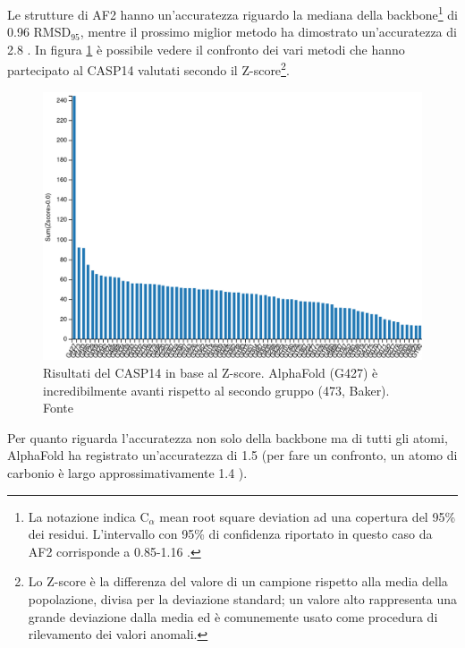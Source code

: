 \par Le strutture di AF2 hanno un'accuratezza riguardo la mediana della backbone\footnote{La notazione indica C$_{\alpha}$ mean root square deviation ad una copertura del 95\% dei residui. L'intervallo con 95\% di confidenza riportato in questo caso da AF2 corrisponde a 0.85-1.16 \angstrom.} di 0.96 RMSD$_{95}$, mentre il prossimo miglior metodo ha dimostrato un'accuratezza di 2.8 \angstrom. In figura \ref{fig:z-score} è possibile vedere il confronto dei vari metodi che hanno partecipato al CASP14 valutati secondo il Z-score\footnote{Lo Z-score è la differenza del valore di un campione rispetto alla media della popolazione, divisa per la deviazione standard; un valore alto rappresenta una grande deviazione dalla media ed è comunemente usato come procedura di rilevamento dei valori anomali.}. 

\begin{figure}[!htb]
	\centering
	\includegraphics[scale=0.45]{images/casp_res.png}
	\caption{Risultati del CASP14 in base al Z-score. AlphaFold (G427) è incredibilmente avanti rispetto al secondo gruppo (473, Baker). Fonte\cite{CaspRes}}
	\label{fig:z-score}
\end{figure}

Per quanto riguarda l'accuratezza non solo della backbone ma di tutti gli atomi, AlphaFold ha registrato un'accuratezza di 1.5 \angstrom (per fare un confronto, un atomo di carbonio è largo approssimativamente 1.4 \angstrom).

